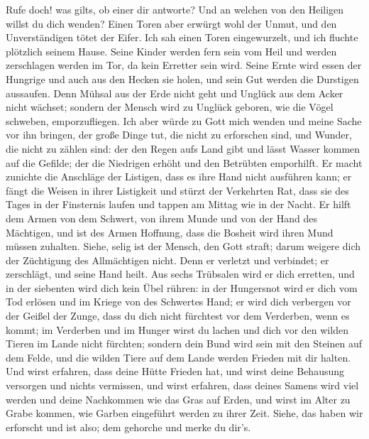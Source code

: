  Rufe doch! was gilts, ob einer dir antworte? Und an
welchen von den Heiligen willst du dich wenden?  Einen
Toren aber erwürgt wohl der Unmut, und den Unverständigen tötet der
Eifer.  Ich sah einen Toren eingewurzelt, und ich fluchte
plötzlich seinem Hause.  Seine Kinder werden fern sein vom
Heil und werden zerschlagen werden im Tor, da kein Erretter sein wird.
 Seine Ernte wird essen der Hungrige und auch aus den
Hecken sie holen, und sein Gut werden die Durstigen aussaufen.
 Denn Mühsal aus der Erde nicht geht und Unglück aus dem
Acker nicht wächset;  sondern der Mensch wird zu Unglück
geboren, wie die Vögel schweben, emporzufliegen.  Ich aber
würde zu Gott mich wenden und meine Sache vor ihn bringen,
 der große Dinge tut, die nicht zu erforschen sind, und
Wunder, die nicht zu zählen sind:  der den Regen aufs
Land gibt und lässt Wasser kommen auf die Gefilde;  der
die Niedrigen erhöht und den Betrübten emporhilft.  Er
macht zunichte die Anschläge der Listigen, dass es ihre Hand nicht
ausführen kann;  er fängt die Weisen in ihrer Listigkeit
und stürzt der Verkehrten Rat,  dass sie des Tages in der
Finsternis laufen und tappen am Mittag wie in der Nacht. 
Er hilft dem Armen von dem Schwert, von ihrem Munde und von der Hand des
Mächtigen,  und ist des Armen Hoffnung, dass die Bosheit
wird ihren Mund müssen zuhalten.  Siehe, selig ist der
Mensch, den Gott straft; darum weigere dich der Züchtigung des
Allmächtigen nicht.  Denn er verletzt und verbindet; er
zerschlägt, und seine Hand heilt.  Aus sechs Trübsalen
wird er dich erretten, und in der siebenten wird dich kein Übel rühren:
 in der Hungersnot wird er dich vom Tod erlösen und im
Kriege von des Schwertes Hand;  er wird dich verbergen
vor der Geißel der Zunge, dass du dich nicht fürchtest vor dem
Verderben, wenn es kommt;  im Verderben und im Hunger
wirst du lachen und dich vor den wilden Tieren im Lande nicht fürchten;
 sondern dein Bund wird sein mit den Steinen auf dem
Felde, und die wilden Tiere auf dem Lande werden Frieden mit dir halten.
 Und wirst erfahren, dass deine Hütte Frieden hat, und
wirst deine Behausung versorgen und nichts vermissen, 
und wirst erfahren, dass deines Samens wird viel werden und deine
Nachkommen wie das Gras auf Erden,  und wirst im Alter zu
Grabe kommen, wie Garben eingeführt werden zu ihrer Zeit.
 Siehe, das haben wir erforscht und ist also; dem
gehorche und merke du dir's.

